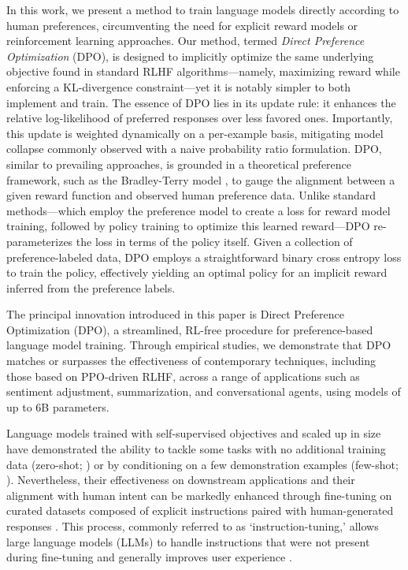 In this work, we present a method to train language models directly according to human preferences, circumventing the need for explicit reward models or reinforcement learning approaches. Our method, termed \textit{Direct Preference Optimization} (DPO), is designed to implicitly optimize the same underlying objective found in standard RLHF algorithms—namely, maximizing reward while enforcing a KL-divergence constraint—yet it is notably simpler to both implement and train. The essence of DPO lies in its update rule: it enhances the relative log-likelihood of preferred responses over less favored ones. Importantly, this update is weighted dynamically on a per-example basis, mitigating model collapse commonly observed with a naive probability ratio formulation. DPO, similar to prevailing approaches, is grounded in a theoretical preference framework, such as the Bradley-Terry model \cite{bradley1952rankanalysis}, to gauge the alignment between a given reward function and observed human preference data. Unlike standard methods—which employ the preference model to create a loss for reward model training, followed by policy training to optimize this learned reward—DPO re-parameterizes the loss in terms of the policy itself. Given a collection of preference-labeled data, DPO employs a straightforward binary cross entropy loss to train the policy, effectively yielding an optimal policy for an implicit reward inferred from the preference labels.

The principal innovation introduced in this paper is Direct Preference Optimization (DPO), a streamlined, RL-free procedure for preference-based language model training. Through empirical studies, we demonstrate that DPO matches or surpasses the effectiveness of contemporary techniques, including those based on PPO-driven RLHF, across a range of applications such as sentiment adjustment, summarization, and conversational agents, using models of up to 6B parameters.

Language models trained with self-supervised objectives and scaled up in size have demonstrated the ability to tackle some tasks with no additional training data (zero-shot; \citep{radford2019language}) or by conditioning on a few demonstration examples (few-shot; \citep{gpt3,megatron,chowdhery2022palm}). Nevertheless, their effectiveness on downstream applications and their alignment with human intent can be markedly enhanced through fine-tuning on curated datasets composed of explicit instructions paired with human-generated responses \citep{mishra-etal-2022-cross,sanh2022multitask,chung2022scaling,thoppilan2022lamda}. This process, commonly referred to as `instruction-tuning,' allows large language models (LLMs) to handle instructions that were not present during fine-tuning and generally improves user experience \citep{chung2022scaling}. 

